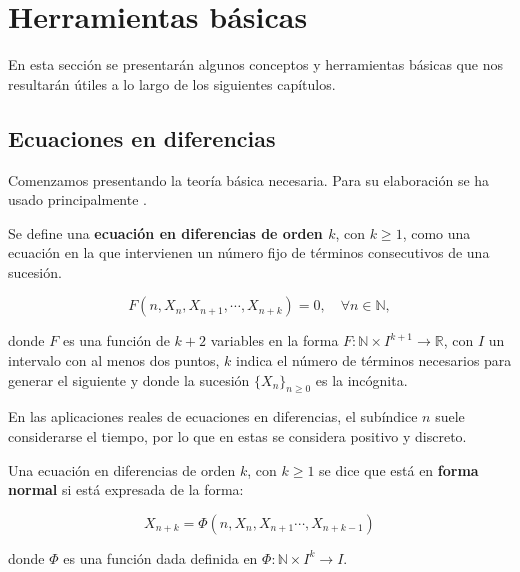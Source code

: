 
\chapter{Herramientas básicas}

En esta sección se presentarán algunos conceptos y herramientas básicas que nos resultarán útiles a lo largo de los siguientes capítulos.

\section{Ecuaciones en diferencias}

Comenzamos presentando la teoría básica necesaria. Para su elaboración se ha usado principalmente \cite{salinelliDiscreteDynamicalModels2014}.

\begin{definition}
Se define una \textbf{ecuación en diferencias de orden $k$}, con $k\geq 1$, como una ecuación en la que intervienen un número fijo de términos consecutivos de una sucesión.

\begin{equation}
\label{def_ec_diferencias}
F(n,X_n, X_{n+1}, \cdots , X_{n+k}) = 0, \quad \forall n\in\mathbb{N},
\end{equation}


donde $F$ es una función de $k+2$ variables en la forma $F:\mathbb{N}\times I^{k+1}\rightarrow \mathbb{R}$, con $I$ un intervalo con al menos dos puntos, $k$ indica el número de términos necesarios para generar el siguiente y donde la sucesión $\{X_n\}_{n\geq 0}$ es la incógnita.
\end{definition}

En las aplicaciones reales de ecuaciones en diferencias, el subíndice $n$ suele considerarse el tiempo, por lo que en estas se considera positivo y discreto.

\begin{definition}
Una ecuación en diferencias de orden $k$, con $k\geq 1$ se dice que está en \textbf{forma normal} si está expresada de la forma:

\begin{equation}
\label{def_ec_forma_normal}
X_{n+k} = \Phi (n, X_n, X_{n+1}\cdots , X_{n+k-1})
\end{equation}


donde $\Phi$ es una función dada definida en $\Phi :\mathbb{N}\times I^{k}\rightarrow I$.
\end{definition}

